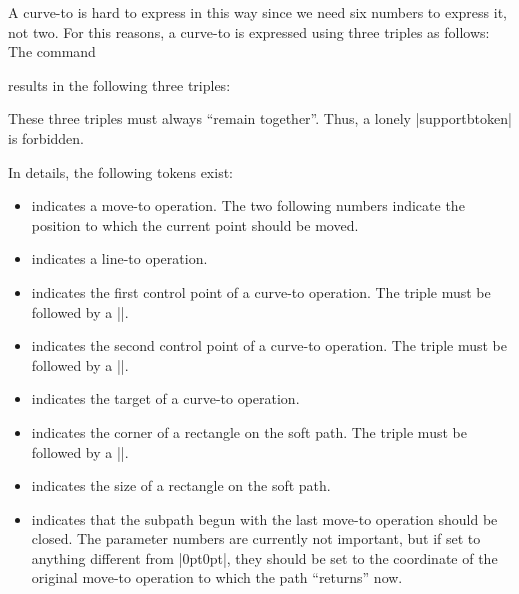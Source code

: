 A curve-to is hard to express in this way since we need six numbers to express
it, not two. For this reasons, a curve-to is expressed using three triples as
follows: The command
%
\begin{codeexample}
\pgfsyssoftpath@curveto{1bp}{2bp}{3bp}{4bp}{5bp}{6bp}
\end{codeexample}
%
\noindent results in the following three triples:
%
\begin{codeexample}
\pgfsyssoftpath@curvetosupportatoken{1bp}{2bp}
\pgfsyssoftpath@curvetosupportbtoken{3bp}{4bp}
\pgfsyssoftpath@curvetotoken{5bp}{6bp}
\end{codeexample}

These three triples must always ``remain together''. Thus, a lonely
|supportbtoken| is forbidden.

In details, the following tokens exist:
%
\begin{itemize}
    \item \declare{|\pgfsyssoftpath@movetotoken|} indicates a move-to
        operation. The two following numbers indicate the position to which the
        current point should be moved.
    \item \declare{|\pgfsyssoftpath@linetotoken|} indicates a line-to
        operation.
    \item \declare{|\pgfsyssoftpath@curvetosupportatoken|} indicates the first
        control point of a curve-to operation. The triple must be followed by a
        |\pgfsyssoftpath@curvetosupportbtoken|.
    \item \declare{|\pgfsyssoftpath@curvetosupportbtoken|} indicates the second
        control point of a curve-to operation. The triple must be followed by a
        |\pgfsyssoftpath@curvetotoken|.
    \item \declare{|\pgfsyssoftpath@curvetotoken|} indicates the target of a
        curve-to operation.
    \item \declare{|\pgfsyssoftpath@rectcornertoken|} indicates the corner of a
        rectangle on the soft path. The triple must be followed by a
        |\pgfsyssoftpath@rectsizetoken|.
    \item \declare{|\pgfsyssoftpath@rectsizetoken|} indicates the size of a
        rectangle on the soft path.
    \item \declare{|\pgfsyssoftpath@closepath|} indicates that the subpath
        begun with the last move-to operation should be closed. The parameter
        numbers are currently not important, but if set to anything different
        from |{0pt}{0pt}|, they should be set to the coordinate of the original
        move-to operation to which the path ``returns'' now.
\end{itemize}
